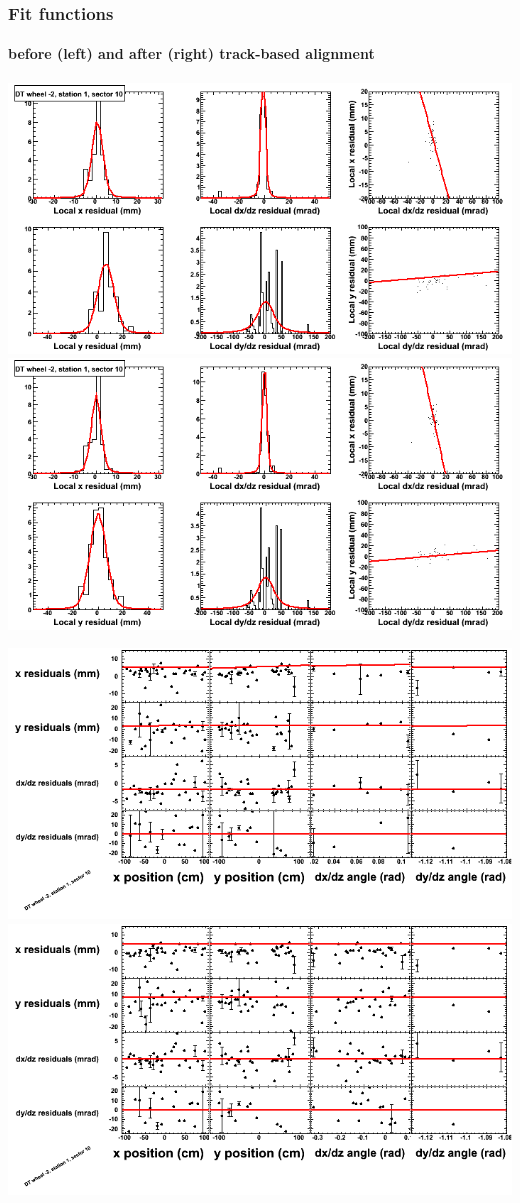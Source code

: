 \documentclass[compress]{beamer}
\begin{document}
\begin{frame}
\frametitle{Fit functions}
\framesubtitle{before (left) and after (right) track-based alignment}
\includegraphics[width=0.5\linewidth]{fitfunctions_re01/MBwhAst1sec10_bellcurves.png} \includegraphics[width=0.5\linewidth]{fitfunctions_re05/MBwhAst1sec10_bellcurves.png}

\includegraphics[width=0.5\linewidth]{fitfunctions_re01/MBwhAst1sec10_polynomials.png} \includegraphics[width=0.5\linewidth]{fitfunctions_re05/MBwhAst1sec10_polynomials.png}
\end{frame}
\end{document}
